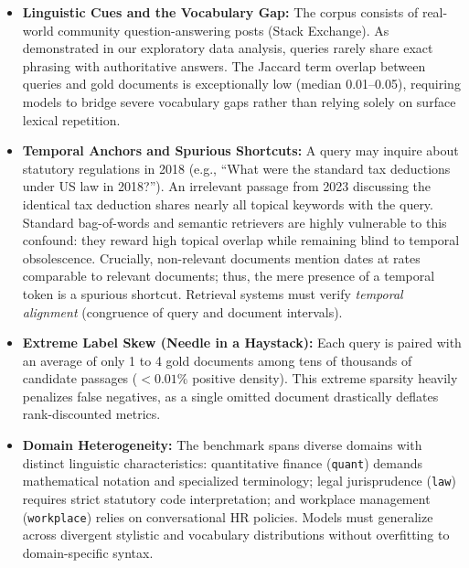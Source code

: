 \begin{itemize}
    \item \textbf{Linguistic Cues and the Vocabulary Gap:} The corpus consists of real-world community question-answering posts (Stack Exchange). As demonstrated in our exploratory data analysis, queries rarely share exact phrasing with authoritative answers. The Jaccard term overlap between queries and gold documents is exceptionally low (median 0.01--0.05), requiring models to bridge severe vocabulary gaps rather than relying solely on surface lexical repetition.
    \item \textbf{Temporal Anchors and Spurious Shortcuts:} A query may inquire about statutory regulations in 2018 (e.g., ``What were the standard tax deductions under US law in 2018?''). An irrelevant passage from 2023 discussing the identical tax deduction shares nearly all topical keywords with the query. Standard bag-of-words and semantic retrievers are highly vulnerable to this confound: they reward high topical overlap while remaining blind to temporal obsolescence. Crucially, non-relevant documents mention dates at rates comparable to relevant documents; thus, the mere presence of a temporal token is a spurious shortcut. Retrieval systems must verify \textit{temporal alignment} (congruence of query and document intervals).
    \item \textbf{Extreme Label Skew (Needle in a Haystack):} Each query is paired with an average of only 1 to 4 gold documents among tens of thousands of candidate passages ($<0.01\%$ positive density). This extreme sparsity heavily penalizes false negatives, as a single omitted document drastically deflates rank-discounted metrics.
    \item \textbf{Domain Heterogeneity:} The benchmark spans diverse domains with distinct linguistic characteristics: quantitative finance (\texttt{quant}) demands mathematical notation and specialized terminology; legal jurisprudence (\texttt{law}) requires strict statutory code interpretation; and workplace management (\texttt{workplace}) relies on conversational HR policies. Models must generalize across divergent stylistic and vocabulary distributions without overfitting to domain-specific syntax.
\end{itemize}

